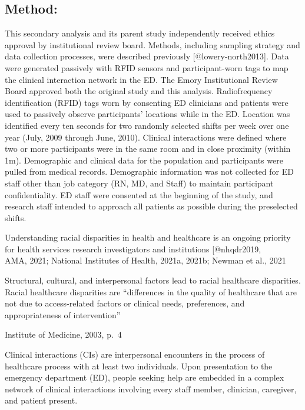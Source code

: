 \documentclass[
]{article}
\begin{document}
\hypertarget{method}{%
\subsection{Method:}\label{method}}

This secondary analysis and its parent study independently received
ethics approval by institutional review board. Methods, including
sampling strategy and data collection processes, were described
previously {[}@lowery-north2013{]}. Data were generated passively with
RFID sensors and participant-worn tags to map the clinical interaction
network in the ED. The Emory Institutional Review Board approved both
the original study and this analysis. Radiofrequency identification
(RFID) tags worn by consenting ED clinicians and patients were used to
passively observe participants' locations while in the ED. Location was
identified every ten seconds for two randomly selected shifts per week
over one year (July, 2009 through June, 2010). Clinical interactions
were defined where two or more participants were in the same room and in
close proximity (within 1m). Demographic and clinical data for the
population and participants were pulled from medical records.
Demographic information was not collected for ED staff other than job
category (RN, MD, and Staff) to maintain participant confidentiality. ED
staff were consented at the beginning of the study, and research staff
intended to approach all patients as possible during the preselected
shifts.

Understanding racial disparities in health and healthcare is an ongoing
priority for health services research investigators and institutions
{[}@nhqdr2019,\\
AMA, 2021; National Institutes of Health, 2021a, 2021b; Newman et al.,
2021

Structural, cultural, and interpersonal factors lead to racial
healthcare disparities. Racial healthcare disparities are ``differences
in the quality of healthcare that are not due to access-related factors
or clinical needs, preferences, and appropriateness of intervention''

Institute of Medicine, 2003, p.~4

Clinical interactions (CIs) are interpersonal encounters in the process
of healthcare process with at least two individuals. Upon presentation
to the emergency department (ED), people seeking help are embedded in a
complex network of clinical interactions involving every staff member,
clinician, caregiver, and patient present.
\end{document}
